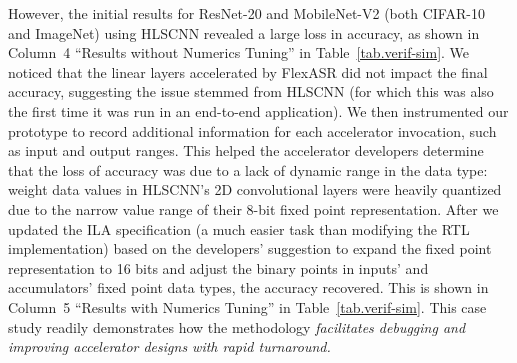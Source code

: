 %
% 


%

However, the initial results for ResNet-20 and MobileNet-V2
  (both CIFAR-10 and ImageNet)
  using HLSCNN
  revealed a large loss in accuracy, 
  {as shown in Column~4 ``Results without Numerics Tuning'' in Table~\ref{tab.verif-sim}}.
We noticed that the linear layers 
  accelerated by FlexASR 
  did not impact the final accuracy,
  suggesting the issue stemmed from HLSCNN
  (for which this was also the first time it was run in an end-to-end application).
We then instrumented
  our {\TLA} prototype 
  to record additional information
  for each accelerator invocation,
  such as input and output ranges.
This helped 
  the accelerator developers
  determine that the loss of accuracy
  was due to a lack of dynamic range in the data type:
  weight data values 
  in HLSCNN's 2D convolutional layers
  were heavily quantized
  due to the narrow value range
  of their 8-bit fixed point representation.
After we updated the ILA specification (a much easier task than modifying the RTL implementation) based on the developers' suggestion to expand the fixed point representation to 16 bits and adjust the binary points in inputs' and accumulators' fixed point data types, the %
accuracy recovered.
{This is shown in Column~5 ``Results with Numerics Tuning'' in Table~\ref{tab.verif-sim}.}
This case study readily demonstrates
  how the {\TLA} methodology
  \textit{facilitates debugging and improving accelerator designs
  with rapid turnaround.}

\iffalse
{
Table~\ref{tab.verif-sim-imagenet} extend the application-level co-simulation experiment for offloading MobileNet-V2 application to the three target accelerators using the ImageNet dataset~\cite{deng2009imagenet}.
Comparing it with Table~\ref{tab.verif-sim}, we can see that there is an significant accuracy drop, i.e., from 10.35\% down to 0.10\%, for the results without numerical tuning when HLSCNN is involved.
This marked decrease in accuracy is due to the augmentation in the number of classification classes—increasing from 10 in the CIFAR-10 dataset to 1000 in the ImageNet dataset—as well as the increase in input image resolution—from 1x3x32x32 pixels in CIFAR-10 to 1x3x224x224 pixels in ImageNet. 
This end-to-end application-level co-simulation again help our accelerator developers to identify the lack of dynamic range of the original 8-bit fixed point representation, and the precision mismatch resulting from the binary points configuration in input's, accumulators' and outputs' fixed point data types.
The accuracy is recovered after similar numerical tuning is applied.
}
\fi

